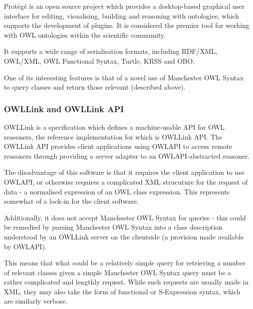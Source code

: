 \documentclass{article}
\begin{document}
Protégé is an open source project which provides a desktop-based graphical user
interface for editing, visualising, building and reasoning with ontologies, which supports
the development of plugins. It is considered the premier tool for working with
OWL ontologies within the scientific community.

It supports a wide range of serialisation formats, including RDF/XML, OWL/XML,
OWL Functional Syntax, Turtle, KRSS and OBO.

One of its interesting features is that of a novel use of Manchester OWL Syntax
to query classes and return those relevant (described above).

\subsubsection{OWLLink and OWLLink API}

OWLLink is a specification which defines a machine-usable API for OWL reasoners,
the reference implementation for which is OWLLink API. The OWLLink API provides
client applications using OWLAPI to access remote reasoners through providing a
server adapter to an OWLAPI-abstracted reasoner. 

The disadvantage of this software is that it requires the client application
to use OWLAPI, or otherwise requires a complicated XML strucuture for the
request of data - a normalised expression of an OWL class expression. This
represents somewhat of a lock-in for the client software. 

Additionally, it does not accept Manchester OWL Syntax for queries - this could 
be remedied by parsing Manchester OWL Syntax into a class description understood 
by an OWLLink server on the clientside (a provision made available by OWLAPI).

This means that what could be a relatively simple query for retrieving a number
of relevant classes given a simple Manchester OWL Syntax query must be a rather
complicated and lengthly request. While such requests are usually made in XML,
they may also take the form of functional or S-Expression syntax, which
are similarly verbose.
\end{document}
